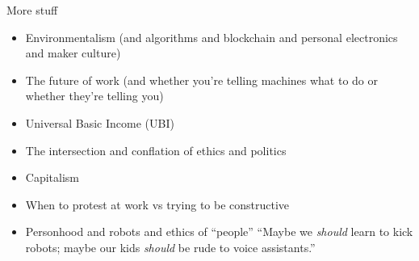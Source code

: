 \documentclass[presentation]{subfiles}
\begin{document}
\begin{frame}{More stuff}
\begin{itemize}
  \item Environmentalism (and algorithms and blockchain and personal electronics and maker culture)
  \item The future of work (and whether you're telling machines what to do or whether they're telling you)
  \item Universal Basic Income (UBI)
  \item The intersection and conflation of ethics and politics
  \item Capitalism
  \item When to protest at work vs trying to be constructive
  \item Personhood and robots and ethics of ``people''
  {\footnotesize ``Maybe we \textit{should} learn to kick robots; maybe our kids \textit{should} be rude to voice assistants.'' }
\end{itemize}
\end{frame}
\end{document}
